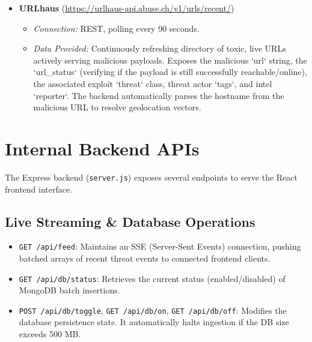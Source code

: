 \documentclass[12pt,a4paper]{article}
\begin{document}
\begin{itemize}[leftmargin=*]
    \item \textbf{URLhaus} (\url{https://urlhaus-api.abuse.ch/v1/urls/recent/})
    \begin{itemize}[noitemsep]
        \item \textit{Connection:} REST, polling every 90 seconds.
        \item \textit{Data Provided:} Continuously refreshing directory of toxic, live URLs actively serving malicious payloads. Exposes the malicious `url` string, the `url_status` (verifying if the payload is still successfully reachable/online), the associated exploit `threat` class, threat actor `tags`, and intel `reporter`. The backend automatically parses the hostname from the malicious URL to resolve geolocation vectors.
    \end{itemize}
\end{itemize}

\newpage
\section{Internal Backend APIs}

The Express backend (\verb|server.js|) exposes several endpoints to serve the React frontend interface.

\subsection{Live Streaming \& Database Operations}
\begin{itemize}
    \item \verb|GET /api/feed|: Maintains an SSE (Server-Sent Events) connection, pushing batched arrays of recent threat events to connected frontend clients.
    \item \verb|GET /api/db/status|: Retrieves the current status (enabled/disabled) of MongoDB batch insertions.
    \item \verb|POST /api/db/toggle|, \verb|GET /api/db/on|, \verb|GET /api/db/off|: Modifies the database persistence state. It automatically halts ingestion if the DB size exceeds 500 MB.
\end{itemize}
\end{document}
